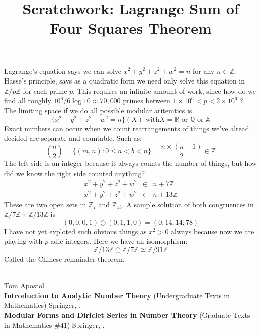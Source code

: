 \documentclass[12pt]{article}
\title{Scratchwork: Lagrange Sum of Four Squares Theorem}
\date{}
\begin{document}
\sffamily

\maketitle

\noindent Lagrange's equation says we can solve $x^2 + y^2 + z^2 + w^2 = n$ for any $n \in \mathbb{Z}$.  Hasse's principle, says as a quadratic form we need only solve this equation in $\mathbb{Z}/p\mathbb{Z}$ for each prime $p$.  This requires an infinite amount of work, since how do we find all roughly $10^6/6 \log 10 \approx 70,000 $ primes between $1 \times 10^6 < p < 2 \times 10^6$ ?  The limiting space if we do all possible modular aritemtics is
$$  \{ x^2 + y^2 + z^2 + w^2 = n \}(X) \text{ with} X = \mathbb{R} \text{ or }\mathbb{Q} \text{ or } \mathbb{A}$$
Exact numbers can occur when we count rearrangements of things we've alread decided are separate and countable.  Such as:
$$ \binom{n}{2} = \big\{ (m,n) : 0 \leq a < b < n \big\} =  \frac{ n \times (n-1)} {2} \in \mathbb{Z}$$
The left side is an integer because it always counts the number of things, but how did we know the right side counted anything?
\begin{eqnarray*}
x^2 + y^2 + z^2 + w^2 &\in& n + 7 \mathbb{Z}\\
x^2 + y^2 + z^2 + w^2 &\in& n + 13 \mathbb{Z}
\end{eqnarray*}
These are two open sets in $\mathbb{Z}_7$ and $\mathbb{Z}_{13}$. A sample solution of both congruences in $\mathbb{Z}/7\mathbb{Z} \times \mathbb{Z}/13\mathbb{Z}$ is 
$$ (0,0,0,1) \oplus (0,1,1,0) = (0, 14, 14 , 78 )$$
I have not yet exploted such obvious things as $x^2 > 0$ always because now we are playing with $p$-adic integers.  Here we have an isomorphism:
$$ \mathbb{Z}/13\mathbb{Z} \oplus \mathbb{Z}/7\mathbb{Z} \simeq \mathbb{Z}/91\mathbb{Z}  $$
Called the Chinese remainder theorem. 
\\ \\

\begin{thebibliography}{}

\item Tom Apostol \\
\textbf{Introduction to Analytic Number Theory} (Undergraduate Texts in Mathematics) Springer, . \\
\textbf{Modular Forms and Diriclet Series in Number Theory} (Graduate Texts in Mathematics \#41) Springer, .


\end{thebibliography}
\end{document}
